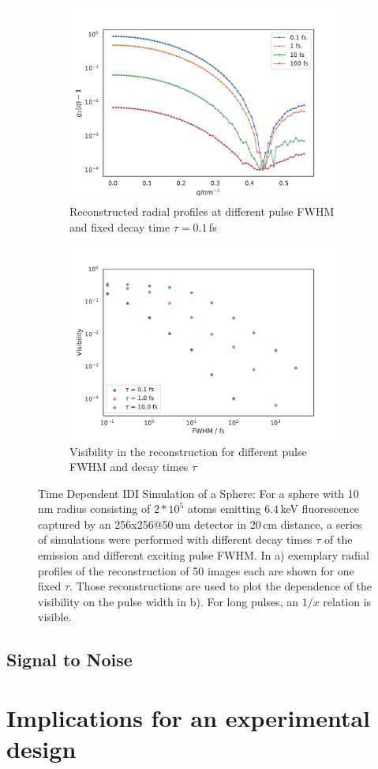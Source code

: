 \begin{figure}
	\begin{subfigure}[b]{0.45\textwidth}
		\includegraphics[width=\linewidth]{images/tdsphere.pdf}
		\caption{Reconstructed radial profiles at different pulse FWHM and fixed decay time $\tau = 0.1$\,fs}
	\end{subfigure}
	\begin{subfigure}[b]{0.45\textwidth}
		\includegraphics[width=\linewidth]{images/tdpspherevis.pdf}
		\caption{Visibility in the reconstruction for different pulse FWHM and decay times $\tau$}
	\end{subfigure}
	\caption[Time Dependent IDI Simulation of a Sphere]{Time Dependent IDI Simulation of a Sphere: For a sphere with 10\,nm radius consisting of $2*10^5$ atoms emitting 6.4\,keV fluorescence captured by an 256x256@50\,um detector in 20\,cm distance, a series of simulations were performed with different decay times $\tau$ of the emission and different exciting pulse FWHM. In a) exemplary radial profiles of the reconstruction of 50 images each are shown for one fixed $\tau$. Those reconstructions are used to plot the  dependence of the visibility on the pulse width in b). For long pulses, an $1/x$ relation is visible.}
	\label{fig:tdpshere}
\end{figure}

\subsection{Signal to Noise}

\section{Implications for an experimental design}
